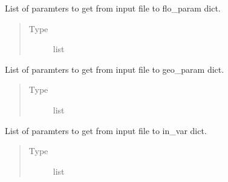 \documentclass[letterpaper,10pt,english]{sphinxmanual}
\begin{document}
\begin{fulllineitems}
\begin{fulllineitems}
\begin{quote}
\begin{description}
\end{description}\end{quote}

\end{fulllineitems}


\begin{fulllineitems}
\label{\detokenize{autoapi/Input/index:Input.Input.flo_p}}
\sphinxAtStartPar
List of paramters to get from input file to flo\_param dict.
\begin{quote}\begin{description}
\item[{Type}] \leavevmode
\sphinxAtStartPar
list

\end{description}\end{quote}

\end{fulllineitems}


\begin{fulllineitems}
\label{\detokenize{autoapi/Input/index:Input.Input.geo_p}}
\sphinxAtStartPar
List of paramters to get from input file to geo\_param dict.
\begin{quote}\begin{description}
\item[{Type}] \leavevmode
\sphinxAtStartPar
list

\end{description}\end{quote}

\end{fulllineitems}


\begin{fulllineitems}
\label{\detokenize{autoapi/Input/index:Input.Input.in_v}}
\sphinxAtStartPar
List of paramters to get from input file to in\_var dict.
\begin{quote}\begin{description}
\item[{Type}] \leavevmode
\sphinxAtStartPar
list


\end{description}
\end{quote}
\end{fulllineitems}
\end{fulllineitems}
\end{document}
